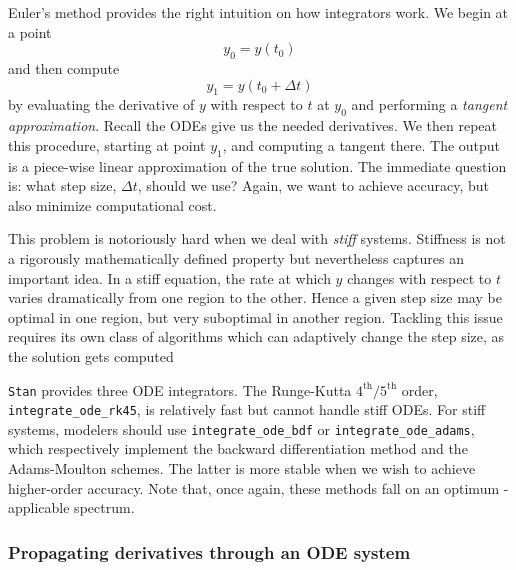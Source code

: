 \documentclass[11pt]{article}
\begin{document}
Euler's method provides the right intuition on how integrators work.
We begin at a point $$y_0 = y(t_0)$$
and then compute $$y_1 = y(t_0 + \Delta t)$$ by evaluating the derivative of $y$ with respect to $t$
at $y_0$ and performing a \textit{tangent approximation}.
Recall the ODEs give us the needed derivatives.
We then repeat this procedure, starting at point $y_1$, and computing a tangent there.
The output is a piece-wise linear approximation of the true solution.
The immediate question is: what step size, $\Delta t$, should we use?
Again, we want to achieve accuracy, but also minimize computational cost.

This problem is notoriously hard when we deal with \textit{stiff} systems.
Stiffness is not a rigorously mathematically defined property but nevertheless captures an important
idea. In a stiff equation, the rate at which $y$ changes with respect to $t$
varies dramatically from one region
to the other. Hence a given step size may be optimal in one region, but very suboptimal
in another region. Tackling this issue requires its own class of algorithms which can adaptively
change the step size, as the solution gets computed


\texttt{Stan} provides three ODE integrators. The Runge-Kutta $4^\mathrm{th}/5^\mathrm{th}$ order, \\
\texttt{integrate\_ode\_rk45}, is relatively fast but cannot handle stiff ODEs.
For stiff systems, modelers should use \texttt{integrate\_ode\_bdf} or \texttt{integrate\_ode\_adams},
which respectively implement the backward differentiation method and the Adams-Moulton schemes.
The latter is more stable when we wish to achieve higher-order accuracy.
Note that, once again, these methods fall on an optimum - applicable spectrum.


\subsubsection{Propagating derivatives through an ODE system}
\end{document}
